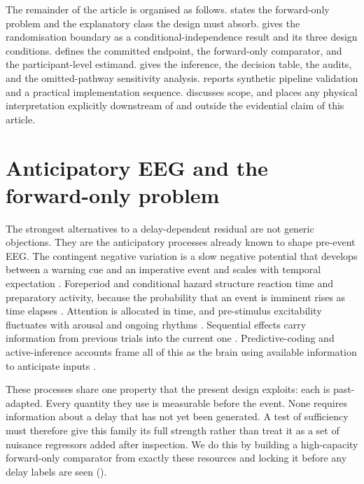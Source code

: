 \documentclass[11pt,a4paper]{article}
\theoremstyle{definition}
\begin{document}
The remainder of the article is organised as follows.
 states the forward-only problem and the explanatory
class the design must absorb.  gives the
randomisation boundary as a conditional-independence result and its three design
conditions.  defines the committed
endpoint, the forward-only comparator, and the participant-level estimand.
 gives the inference, the decision table,
the audits, and the omitted-pathway sensitivity analysis.
 reports synthetic pipeline validation and a
practical implementation sequence.  discusses scope, and
places any physical interpretation explicitly downstream of and outside the
evidential claim of this article.

\section{Anticipatory EEG and the forward-only problem}
\label{sec:anticipatory-eeg}

The strongest alternatives to a delay-dependent residual are not generic
objections. They are the anticipatory processes already known to shape pre-event
EEG. The contingent negative variation is a slow negative potential that develops
between a warning cue and an imperative event and scales with temporal
expectation \citep{Walter1964,Macar2004,Trillenberg2000}. Foreperiod and
conditional hazard structure reaction time and preparatory activity, because the
probability that an event is imminent rises as time elapses
\citep{Niemi1981,Los2001,Nobre2010,Coull2009}. Attention is allocated in time,
and pre-stimulus excitability fluctuates with arousal and ongoing rhythms
\citep{Miniussi1999,Vanrullen2013}. Sequential effects carry information from
previous trials into the current one \citep{Steinborn2008}. Predictive-coding
and active-inference accounts frame all of this as the brain using available
information to anticipate inputs \citep{Friston2010,Clark2013,Hohwy2013,%
Millidge2021,FristonKiebel2009}.

These processes share one property that the present design exploits: each is
past-adapted. Every quantity they use is measurable before the event. None
requires information about a delay that has not yet been generated. A test of
sufficiency must therefore give this family its full strength rather than treat
it as a set of nuisance regressors added after inspection. We do this by building
a high-capacity forward-only comparator from exactly these resources and locking
it before any delay labels are seen ().
\end{document}
